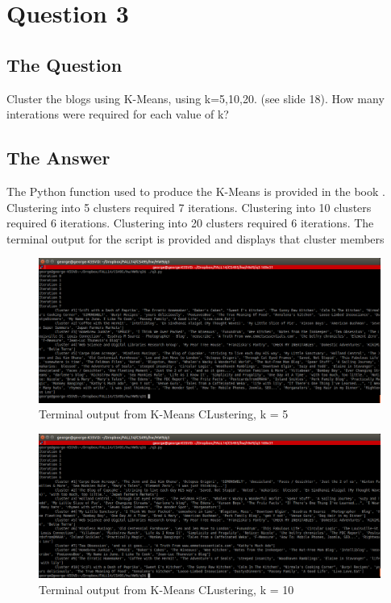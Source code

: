 \section{Question 3}

\subsection{The Question}

\begin{flushleft}

 Cluster the blogs using K-Means, using k=5,10,20. (see slide 18).
How many interations were required for each value of k?

\end{flushleft}
\subsection{The Answer}

The Python function used to produce the K-Means is provided in the book \cite{PCI}. Clustering into 5 clusters required 7 iterations. Clustering into 10 clusters required 6 iterations. Clustering into 20 clusters required 6 iterations.  The terminal output for the script is provided and displays that cluster members





\begin{figure}
\centering
\includegraphics[width=\textwidth]{../q3/clust5.png}
\caption{Terminal output from K-Means CLustering, k = 5}
\end{figure}


\begin{figure}
\centering
\includegraphics[width=\textwidth]{../q3/clust10.png}
\caption{Terminal output from K-Means CLustering, k = 10}
\end{figure}

